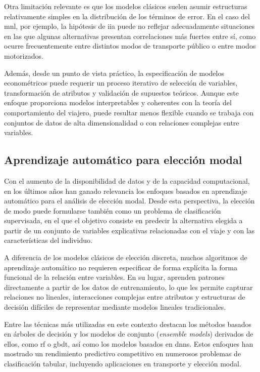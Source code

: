Otra limitación relevante es que los modelos clásicos suelen asumir estructuras relativamente simples en la distribución de los términos de error. En el caso del \acrlong{mnl}, por ejemplo, la hipótesis de \acrlong{iia} puede no reflejar adecuadamente situaciones en las que algunas alternativas presentan correlaciones más fuertes entre sí, como ocurre frecuentemente entre distintos modos de transporte público o entre modos motorizados.\newline

Además, desde un punto de vista práctico, la especificación de modelos econométricos puede requerir un proceso iterativo de selección de variables, transformación de atributos y validación de supuestos teóricos. Aunque este enfoque proporciona modelos interpretables y coherentes con la teoría del comportamiento del viajero, puede resultar menos flexible cuando se trabaja con conjuntos de datos de alta dimensionalidad o con relaciones complejas entre variables.


\subsection{Aprendizaje automático para elección modal}

Con el aumento de la disponibilidad de datos y de la capacidad computacional, en los últimos años han ganado relevancia los enfoques basados en aprendizaje automático para el análisis de elección modal. Desde esta perspectiva, la elección de modo puede formularse también como un problema de clasificación supervisada, en el que el objetivo consiste en predecir la alternativa elegida a partir de un conjunto de variables explicativas relacionadas con el viaje y con las características del individuo.
\newpage

A diferencia de los modelos clásicos de elección discreta, muchos algoritmos de aprendizaje automático no requieren especificar de forma explícita la forma funcional de la relación entre variables. En su lugar, aprenden patrones directamente a partir de los datos de entrenamiento, lo que les permite capturar relaciones no lineales, interacciones complejas entre atributos y estructuras de decisión difíciles de representar mediante modelos lineales tradicionales.\newline

Entre las técnicas más utilizadas en este contexto destacan los métodos basados en árboles de decisión y los modelos de conjunto (\textit{ensemble models}) derivados de ellos, como \acrlong{rf} o \acrlong{gbdt}, así como los modelos basados en \glspl{dnn}. Estos enfoques han mostrado un rendimiento predictivo competitivo en numerosos problemas de clasificación tabular, incluyendo aplicaciones en transporte y elección modal.\newline

